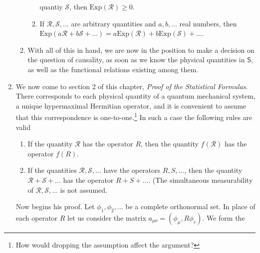 \documentclass[a4paper]{article}
\theoremstyle{definition}
\theoremstyle{plain}
\begin{document}
\begin{enumerate}
\begin{enumerate}
\begin{enumerate}
                        quantiy $\mathcal{S}$, then
                        $\text{Exp}(\mathcal{R}) \geq 0$.
                    \item If
                        $\mathcal{R},\mathcal{S},\ldots$ are
                        arbitrary quantities and
                        $a,b,\ldots$ real numbers, then
                        $\text{Exp}(a \mathcal{R} + b
                        \mathcal{S} + \ldots) = a
                        \text{Exp}(\mathcal{R}) + b
                        \text{Exp}(\mathcal{S}) + \ldots$.
                \end{enumerate}
            \item With all of this in hand, we are now in
                the position to make a decision on the
                question of causality, as soon as we know
                the physical quantities in $\mathsf S$, as
                well as the functional relations existing
                among them.
        \end{enumerate}
        \item  We now come to section 2 of this chapter,
            \textit{Proof of the Statistical Formulas}.
            There corresponds to each physical quantity of a
            quantum mechanical system, a unique hypermaximal
            Hermitian operator, and it is convenient to
            assume that this correspondence is
            one-to-one.\footnote{How would dropping the
            assumption affect the argument?} In such a case
            the following rules are valid
            \begin{enumerate}
                \item If the quantity $\mathcal{R}$ has the
                    operator $R$, then the quantity
                    $f(\mathcal{R})$ has the operator
                    $f(R)$.
                \item If the quantities
                    $\mathcal{R},\mathcal{S},\ldots$ have
                    the operators $R,S,\ldots$, then the
                    quantity $\mathcal{R} + \mathcal{S} +
                    \ldots$ has the operator $R + S +
                    \ldots$. (The simultaneous measurability
                    of $\mathcal{R},\mathcal{S},\ldots$ is
                    not assumed.
            \end{enumerate}
            Now begins his proof. Let $\phi_1,\phi_2,\ldots$ 
            be a complete orthonormal set. In place of each
            operator $R$ let us consider the matrix
            $a_{\mu\nu} = (\phi_\mu, R\phi_v)$. We form the

\end{enumerate}
\end{document}
